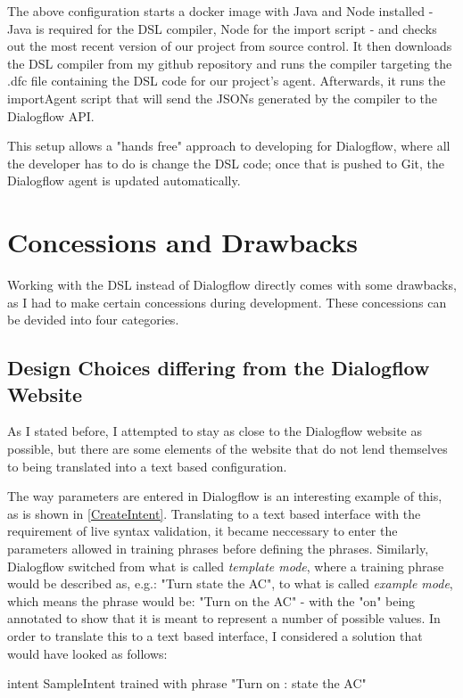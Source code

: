 The above configuration starts a docker image with Java and Node installed - Java is required for the DSL compiler, Node for the import script - and checks out the most recent version of our project from source control.
It then downloads the DSL compiler from my github repository and runs the compiler targeting the .dfc file containing the DSL code for our project's agent.
Afterwards, it runs the importAgent script that will send the JSONs generated by the compiler to the Dialogflow API.

This setup allows a "hands free" approach to developing for Dialogflow, where all the developer has to do is change the DSL code; once that is pushed to Git, the Dialogflow agent is updated automatically.


\section{Concessions and Drawbacks}

Working with the DSL instead of Dialogflow directly comes with some drawbacks, as I had to make certain concessions during development. 
These concessions can be devided into four categories.

\subsection{Design Choices differing from the Dialogflow Website}
As I stated before, I attempted to stay as close to the Dialogflow website as possible, but there are some elements of the website that do not lend themselves to being translated into a text based configuration.

The way parameters are entered in Dialogflow is an interesting example of this, as is shown in \autoref{CreateIntent}. Translating to a text based interface with the requirement of live syntax validation, it became neccessary to enter the parameters allowed in training phrases before defining the phrases.
Similarly, Dialogflow switched from what is called \textit{template mode}, where a training phrase would be described as, e.g.: "Turn state the AC", to what is called \textit{example mode}, which means the phrase would be: "Turn on the AC" - with the "on" being annotated to show that it is meant to represent a number of possible values.
In order to translate this to a text based interface, I considered a solution that would have looked as follows:

\begin{DSL}
    intent SampleIntent
        trained with phrase
            "Turn {on : state} the AC"
\end{DSL}

